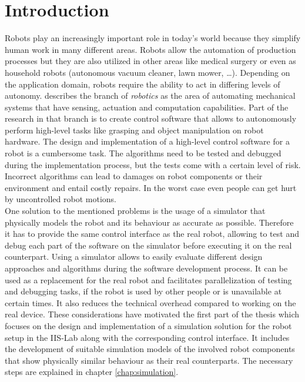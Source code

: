 
\chapter{Introduction}
\label{chap:introduction}

Robots play an increasingly important role in today's world because they simplify human work in many different areas. Robots allow the automation of production processes but they are also utilized in other areas like medical surgery or even as household robots (autonomous vacuum cleaner, lawn mower, \ldots). Depending on the application domain, robots require the ability to act in differing levels of autonomy. \citep{lavalle2006} describes the branch of \emph{robotics} as the area of automating mechanical systems that have sensing, actuation and computation capabilities. Part of the research in that branch is to create control software that allows to autonomously perform high-level tasks like grasping and object manipulation on robot hardware. The design and implementation of a high-level control software for a robot is a cumbersome task. The algorithms need to be tested and debugged during the implementation process, but the tests come with a certain level of risk. Incorrect algorithms can lead to damages on robot components or their environment and entail costly repairs. In the worst case even people can get hurt by uncontrolled robot motions.\\

One solution to the mentioned problems is the usage of a simulator that physically models the robot and its behaviour as accurate as possible. Therefore it has to provide the same control interface as the real robot, allowing to test and debug each part of the software on the simulator before executing it on the real counterpart. Using a simulator allows to easily evaluate different design approaches and algorithms during the software development process. It can be used as a replacement for the real robot and facilitates parallelization of testing and debugging tasks, if the robot is used by other people or is unavailable at certain times. It also reduces the technical overhead compared to working on the real device. These considerations have motivated the first part of the thesis which focuses on the design and implementation of a simulation solution for the robot setup in the IIS-Lab along with the corresponding control interface. It includes the development of suitable simulation models of the involved robot components that show physically similar behaviour as their real counterparts. The necessary steps are explained in chapter \ref{chap:simulation}.\\

